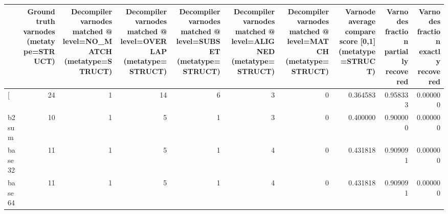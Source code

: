 \begin{tabular}{lrrrrrrrrr}
\toprule
{} &  Ground truth varnodes (metatype=STRUCT) &  Decompiler varnodes matched @ level=NO\_MATCH (metatype=STRUCT) &  Decompiler varnodes matched @ level=OVERLAP (metatype=STRUCT) &  Decompiler varnodes matched @ level=SUBSET (metatype=STRUCT) &  Decompiler varnodes matched @ level=ALIGNED (metatype=STRUCT) &  Decompiler varnodes matched @ level=MATCH (metatype=STRUCT) &  Varnode average compare score [0,1] (metatype=STRUCT) &  Varnodes fraction partially recovered &  Varnodes fraction exactly recovered \\
\midrule
[         &                                       24 &                                                  1 &                                                 14 &                                                  6 &                                                  3 &                                                  0 &                                           0.364583 &                               0.958333 &                             0.000000 \\
b2sum     &                                       10 &                                                  1 &                                                  5 &                                                  1 &                                                  3 &                                                  0 &                                           0.400000 &                               0.900000 &                             0.000000 \\
base32    &                                       11 &                                                  1 &                                                  5 &                                                  1 &                                                  4 &                                                  0 &                                           0.431818 &                               0.909091 &                             0.000000 \\
base64    &                                       11 &                                                  1 &                                                  5 &                                                  1 &                                                  4 &                                                  0 &                                           0.431818 &                               0.909091 &                             0.000000 \\

\end{tabular}
